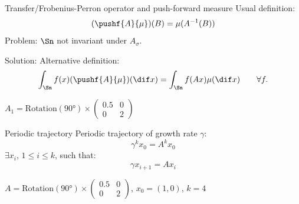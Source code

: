 \documentclass{beamer}
\begin{document}
  \begin{frame}{Transfer/Frobenius-Perron operator and push-forward measure}
    Usual definition:
    \[ (\pushf{A}{\mu})(B) = \mu(A^{-1}(B)) \]
    \alert{Problem}: $\Sn$ not invariant under $A_\sigma$.

    \alert{Solution}: Alternative definition:
    \[ \int_{\Sn} f(x) (\pushf{A}{\mu})(\dif x) = \int_{\Sn} f(Ax) \mu(\dif x) \qquad \forall f. \]

    \begin{example}
      $A_1 = \text{Rotation}(\ang{90}) \times \begin{pmatrix}0.5 & 0\\0 & 2\end{pmatrix}$
      \begin{center}
      \end{center}
    \end{example}
  \end{frame}

  \begin{frame}{Periodic trajectory}
    \alert{Periodic} trajectory of growth rate $\gamma$:
    \[ \gamma^k x_0 = A^k x_0 \]
    $\exists x_i$, $1 \leq i \leq k$, such that:
    \[ \gamma x_{i+1} = A x_i \]

    \begin{example}
      \vspace{-1em}
      $A = \text{Rotation}(\ang{90}) \times \begin{pmatrix}0.5 & 0\\0 & 2\end{pmatrix}$,
      $x_0 = (1, 0)$, $k = 4$
      \vspace{-1em}
      \begin{center}
      \end{center}
    \end{example}
  \end{frame}
\end{document}
